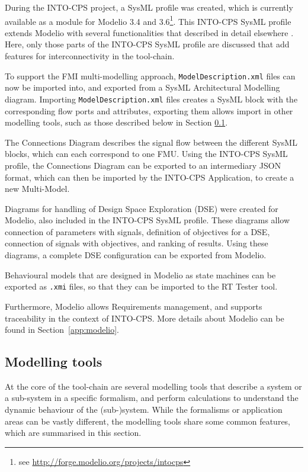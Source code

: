 During the INTO-CPS project, a SysML profile was created, which is currently available as a module for Modelio 3.4 and 3.6\footnote{see \url{http://forge.modelio.org/projects/intocps}}. This INTO-CPS SysML profile extends Modelio with several functionalities that described in detail elsewhere \cite{INTOCPSD41c,INTOCPSD4.2c,INTOCPSD4.3c}. Here, only those parts of the INTO-CPS SysML profile are discussed that add features for interconnectivity in the tool-chain.

To support the FMI multi-modelling approach, \texttt{ModelDescription.xml} files can now be imported into, and exported from a SysML Architectural Modelling diagram. Importing \texttt{ModelDescription.xml} files creates a SysML block with the corresponding flow ports and attributes, exporting them allows import in other modelling tools, such as those described below in Section \ref{sec:toolchain:tools}.

The Connections Diagram describes the signal flow between the different SysML blocks, which can each correspond to one FMU. Using the INTO-CPS SysML profile, the Connections Diagram can be exported to an intermediary JSON format, which can then be imported by the INTO-CPS Application, to create a new Multi-Model.

Diagrams for handling of Design Space Exploration (DSE) were created for Modelio, also included in the INTO-CPS SysML profile. These diagrams allow connection of parameters with signals, definition of objectives for a DSE, connection of signals with objectives, and ranking of results. Using these diagrams, a complete DSE configuration can be exported from Modelio.

Behavioural models that are designed in Modelio as state machines can be exported as \texttt{.xmi} files, so that they can be imported to the RT Tester tool.

Furthermore, Modelio allows Requirements management, and supports traceability in the context of INTO-CPS. More details about Modelio can be found in Section~\ref{app:modelio}.

\subsection{Modelling tools}
\label{sec:toolchain:tools}

At the core of the tool-chain are several modelling tools that describe a system or a sub-system in a specific formalism, and perform calculations to understand the dynamic behaviour of the (sub-)system. While the formalisms or application areas can be vastly different, the modelling tools share some common features, which are summarised in this section.


